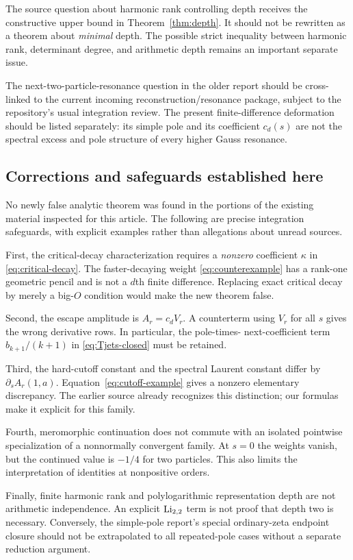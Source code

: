 The source question about harmonic rank controlling depth receives the
constructive upper bound in Theorem~\ref{thm:depth}. It should not be
rewritten as a theorem about \emph{minimal} depth. The possible strict
inequality between harmonic rank, determinant degree, and arithmetic depth
remains an important separate issue.

The next-two-particle-resonance question in the older report should be
cross-linked to the current incoming reconstruction/resonance package,
subject to the repository's usual integration review. The present
finite-difference deformation should be listed separately: its simple
pole and its coefficient $c_d(s)$ are not the spectral excess and pole
structure of every higher Gauss resonance.

\subsection{Corrections and safeguards established here}
No newly false analytic theorem was found in the portions of the existing
material inspected for this article. The following are precise
integration safeguards, with explicit examples rather than allegations
about unread sources.

First, the critical-decay characterization requires a \emph{nonzero}
coefficient $\kappa$ in \eqref{eq:critical-decay}. The faster-decaying
weight \eqref{eq:counterexample} has a rank-one geometric pencil and is
not a $d$th finite difference. Replacing exact critical decay by merely
a big-$O$ condition would make the new theorem false.

Second, the escape amplitude is $A_r=c_dV_r$. A counterterm using $V_r$
for all $s$ gives the wrong derivative rows. In particular, the pole-times-
next-coefficient term $b_{k+1}/(k+1)$ in
\eqref{eq:Tjets-closed} must be retained.

Third, the hard-cutoff constant and the spectral Laurent constant differ
by $\partial_sA_r(1,a)$. Equation~\eqref{eq:cutoff-example} gives a
nonzero elementary discrepancy. The earlier source already recognizes
this distinction; our formulas make it explicit for this family.

Fourth, meromorphic continuation does not commute with an isolated
pointwise specialization of a nonnormally convergent family. At $s=0$
the weights vanish, but the continued value is $-1/4$ for two particles.
This also limits the interpretation of identities at nonpositive orders.

Finally, finite harmonic rank and polylogarithmic representation depth
are not arithmetic independence. An explicit $\operatorname{Li}_{2,2}$ term is not
proof that depth two is necessary. Conversely, the simple-pole report's
special ordinary-zeta endpoint closure should not be extrapolated to
all repeated-pole cases without a separate reduction argument.

